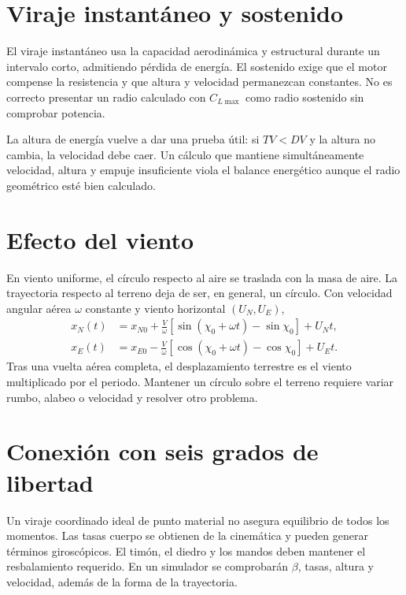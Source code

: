 \section{Viraje instantáneo y sostenido}
El viraje instantáneo usa la capacidad aerodinámica y estructural durante un intervalo corto, admitiendo pérdida de energía. El sostenido exige que el motor compense la resistencia y que altura y velocidad permanezcan constantes. No es correcto presentar un radio calculado con $C_{L\max}$ como radio sostenido sin comprobar potencia.

La altura de energía vuelve a dar una prueba útil: si $TV<DV$ y la altura no cambia, la velocidad debe caer. Un cálculo que mantiene simultáneamente velocidad, altura y empuje insuficiente viola el balance energético aunque el radio geométrico esté bien calculado.


\section{Efecto del viento}
En viento uniforme, el círculo respecto al aire se traslada con la masa de aire. La trayectoria respecto al terreno deja de ser, en general, un círculo. Con velocidad angular aérea $\omega$ constante y viento horizontal $(U_N,U_E)$,
\begin{align}
x_N(t)&=x_{N0}+\frac V\omega[\sin(\chi_0+\omega t)-\sin\chi_0]+U_Nt,\\
x_E(t)&=x_{E0}-\frac V\omega[\cos(\chi_0+\omega t)-\cos\chi_0]+U_Et.
\end{align}
Tras una vuelta aérea completa, el desplazamiento terrestre es el viento multiplicado por el periodo. Mantener un círculo sobre el terreno requiere variar rumbo, alabeo o velocidad y resolver otro problema.

\section{Conexión con seis grados de libertad}
Un viraje coordinado ideal de punto material no asegura equilibrio de todos los momentos. Las tasas cuerpo se obtienen de la cinemática y pueden generar términos giroscópicos. El timón, el diedro y los mandos deben mantener el resbalamiento requerido. En un simulador se comprobarán $\beta$, tasas, altura y velocidad, además de la forma de la trayectoria.

